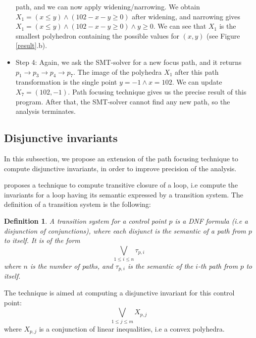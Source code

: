 \documentclass[a4paper,english,titlepage,11pt]{report}
\newtheorem{definition}{Definition}[section]
\begin{document}
\begin{itemize}
path, and we can now apply widening/narrowing. We obtain
$X_1 = (x \leq y) \wedge (102 - x - y \geq 0)$ after widening, and narrowing
gives $X_1 = (x \leq y) \wedge (102 - x - y \geq 0) \wedge y \geq 0$.
We can see that $X_1$ is the smallest polyhedron containing the possible values
for $(x,y)$ (see Figure \ref{result}.b).
\item Step 4: Again, we ask the SMT-solver for a new focus path, and it returns
$p_1 \rightarrow p_3 \rightarrow p_4 \rightarrow p_7$. The image of the
polyhedra $X_1$ after this path transformation is the single point $y=-1 \wedge
x = 102$. We can update $X_7 = {(102,-1)}$. Path focusing technique gives us the
precise result of this program. After that, the SMT-solver cannot find any new
path, so the analysis terminates.
\end{itemize}



	\subsection{Disjunctive invariants}

	In this subsection, we propose an extension of the path focusing technique
	to compute disjunctive invariants, in order to improve precision of the
	analysis.

	\cite{GulwaniZ10} proposes a technique to compute transitive closure of a
	loop, i.e compute the invariants for a loop having its semantic
	expressed by a transition system. The definition of a transition system is
	the following:

	\begin{definition}
	A transition system for a control point $p$ is a DNF formula (i.e a
	disjunction of conjunctions), where each
	disjunct is the semantic of a path from $p$ to itself. It is of the form
	$$\bigvee_{1 \leq i \leq n} \tau_{p,i}$$ where $n$ is the number of
	paths, and $\tau_{p,i}$ is the semantic of the $i$-th path from $p$ to
	itself.
	\end{definition}

	The technique is aimed at computing a disjunctive invariant for this control
	point: 
	$$\displaystyle\bigvee_{1 \leq j \leq m} X_{p,j}$$
	where $X_{p,j}$ is a conjunction of linear inequalities, i.e a convex
	polyhedra.
\end{document}
